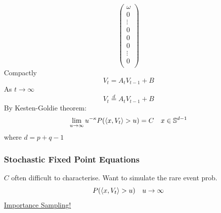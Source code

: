 \documentclass{beamer}
\begin{document}
\begin{frame}
\begin{tiny}
\begin{equation*}
      \begin{pmatrix}
        \omega \\
        0 \\
        \vdots \\
        0 \\
        0 \\
        0 \\
        \vdots \\
        0 \\
      \end{pmatrix}
    \end{equation*}
    Compactly
    \[
    V_t = A_t V_{t-1} + B
    \]
    As $t \to \infty$
    \[
    V_t \overset{d}{=} A_t V_{t-1} + B
    \]
    By Kesten-Goldie theorem:
    \[
    \lim_{u \to \infty} u^{-\kappa} P(\langle x, V_t\rangle > u) = C \quad x \in \mathbb S^{d-1}
    \]
    where $d = p + q -1$
  \end{tiny}
\end{frame}

\begin{frame}
  \frametitle{Stochastic Fixed Point Equations}
  $C$ often difficult to characterise. Want to simulate the rare event prob.
  \[
  P(\langle x, V_t\rangle > u) \quad u \to \infty  
  \]
  \underline{Importance Sampling!}
\end{frame}



\end{document}

